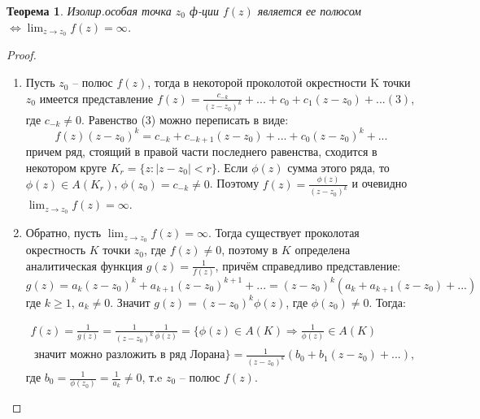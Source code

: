 \documentclass{article}
\newtheorem{theorem}{Теорема}
\begin{document}
\begin{theorem}
   Изолир.особая точка $z_0$ ф-ции $f(z)$ является ее полюсом $\Longleftrightarrow \displaystyle\lim_{z\rightarrow z_0}f(z)=\infty$.
\end{theorem}
\begin{proof}
\begin{enumerate}
    \item Пусть $z_0$ – полюс $f(z)$, тогда в некоторой проколотой окрестности K точки $z_0$ имеется представление $f(z)=\frac{c_{-k}}{(z-z_0)^k}+...+c_0+c_1(z-z_0)+...(3)$,
    где $c_{-k}\neq0$. Равенство (3) можно переписать в виде:
    $$f(z)(z-z_0)^k=c_{-k}+c_{-k+1}(z-z_0)+...+c_0(z-z_0)^k+...$$ причем ряд, стоящий в правой части последнего равенства, сходится в некотором круге $K_r=\{z:|z-z_0|<r\}$. Если $\phi(z)$ сумма этого ряда, то $\phi(z) \in A(K_r)$, $\phi(z_0)=c_{-k}\neq0$. Поэтому $f(z)=\frac{\phi(z)}{(z-z_0)^k}$ и очевидно $\displaystyle\lim_{z\rightarrow z_0}f(z)=\infty$.
    \item Обратно, пусть $\displaystyle\lim_{z\rightarrow z_0}f(z)=\infty$. Тогда существует
    проколотая окрестность $K$ точки $z_0$, где $f(z) \neq 0$, поэтому
    в $K$ определена аналитическая функция $g(z) = \frac{1}{f(z)}$, причём справедливо представление: $$g(z)=a_k(z-z_0)^k+a_{k+1}(z-z_0)^{k+1}+...=(z-z_0)^k(a_k+a_{k+1}(z-z_0)+...)$$ где $k\geq1$, $a_k\neq0$.
    Значит $g(z)=(z-z_0)^k\phi(z)$, где $\phi(z_0)\neq0$. Тогда:
    
    \begin{equation*}
    \begin{gathered}
        f(z)=\frac{1}{g(z)}=\frac{1}{(z-z_0)^k}\frac{1}{\phi(z)}=\{\phi(z) \in A(K) \Rightarrow \frac{1}{\phi(z)} \in A(K) \\
        \text { значит можно разложить в ряд Лорана}\}=
        \frac{1}{(z-z_0)^k}(b_0+b_1(z-z_0)+...),
    \end{gathered}
    \end{equation*}
    где $b_0=\frac{1}{\phi(z_0)}=\frac{1}{a_k}\neq0$, т.e $z_0$ -- полюс $f(z)$.

\end{enumerate}
\end{proof}
\end{document}

